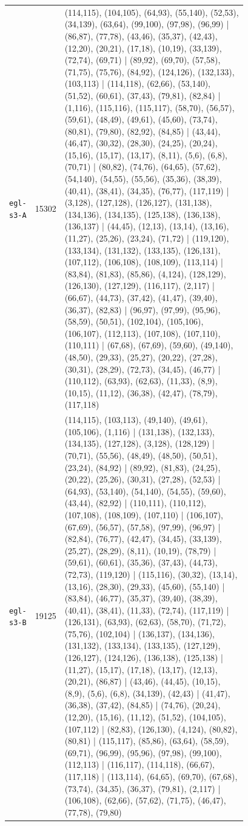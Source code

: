 \begin{landscape}
\begin{longtable}{lr>{\tiny\raggedright\arraybackslash}p{0.78\linewidth}}
\texttt{egl-s3-A} & 15302 & (114,115), (104,105), (64,93), (55,140), (52,53), (34,139), (63,64), (99,100), (97,98), (96,99) | (86,87), (77,78), (43,46), (35,37), (42,43), (12,20), (20,21), (17,18), (10,19), (33,139), (72,74), (69,71) | (89,92), (69,70), (57,58), (71,75), (75,76), (84,92), (124,126), (132,133), (103,113) | (114,118), (62,66), (53,140), (51,52), (60,61), (37,43), (79,81), (82,84) | (1,116), (115,116), (115,117), (58,70), (56,57), (59,61), (48,49), (49,61), (45,60), (73,74), (80,81), (79,80), (82,92), (84,85) | (43,44), (46,47), (30,32), (28,30), (24,25), (20,24), (15,16), (15,17), (13,17), (8,11), (5,6), (6,8), (70,71) | (80,82), (74,76), (64,65), (57,62), (54,140), (54,55), (55,56), (35,36), (38,39), (40,41), (38,41), (34,35), (76,77), (117,119) | (3,128), (127,128), (126,127), (131,138), (134,136), (134,135), (125,138), (136,138), (136,137) | (44,45), (12,13), (13,14), (13,16), (11,27), (25,26), (23,24), (71,72) | (119,120), (133,134), (131,132), (133,135), (126,131), (107,112), (106,108), (108,109), (113,114) | (83,84), (81,83), (85,86), (4,124), (128,129), (126,130), (127,129), (116,117), (2,117) | (66,67), (44,73), (37,42), (41,47), (39,40), (36,37), (82,83) | (96,97), (97,99), (95,96), (58,59), (50,51), (102,104), (105,106), (106,107), (112,113), (107,108), (107,110), (110,111) | (67,68), (67,69), (59,60), (49,140), (48,50), (29,33), (25,27), (20,22), (27,28), (30,31), (28,29), (72,73), (34,45), (46,77) | (110,112), (63,93), (62,63), (11,33), (8,9), (10,15), (11,12), (36,38), (42,47), (78,79), (117,118) \\[2pt]
\texttt{egl-s3-B} & 19125 & (114,115), (103,113), (49,140), (49,61), (105,106), (1,116) | (131,138), (132,133), (134,135), (127,128), (3,128), (128,129) | (70,71), (55,56), (48,49), (48,50), (50,51), (23,24), (84,92) | (89,92), (81,83), (24,25), (20,22), (25,26), (30,31), (27,28), (52,53) | (64,93), (53,140), (54,140), (54,55), (59,60), (43,44), (82,92) | (110,111), (110,112), (107,108), (108,109), (107,110) | (106,107), (67,69), (56,57), (57,58), (97,99), (96,97) | (82,84), (76,77), (42,47), (34,45), (33,139), (25,27), (28,29), (8,11), (10,19), (78,79) | (59,61), (60,61), (35,36), (37,43), (44,73), (72,73), (119,120) | (115,116), (30,32), (13,14), (13,16), (28,30), (29,33), (45,60), (55,140) | (83,84), (46,77), (35,37), (39,40), (38,39), (40,41), (38,41), (11,33), (72,74), (117,119) | (126,131), (63,93), (62,63), (58,70), (71,72), (75,76), (102,104) | (136,137), (134,136), (131,132), (133,134), (133,135), (127,129), (126,127), (124,126), (136,138), (125,138) | (11,27), (15,17), (17,18), (13,17), (12,13), (20,21), (86,87) | (43,46), (44,45), (10,15), (8,9), (5,6), (6,8), (34,139), (42,43) | (41,47), (36,38), (37,42), (84,85) | (74,76), (20,24), (12,20), (15,16), (11,12), (51,52), (104,105), (107,112) | (82,83), (126,130), (4,124), (80,82), (80,81) | (115,117), (85,86), (63,64), (58,59), (69,71), (96,99), (95,96), (97,98), (99,100), (112,113) | (116,117), (114,118), (66,67), (117,118) | (113,114), (64,65), (69,70), (67,68), (73,74), (34,35), (36,37), (79,81), (2,117) | (106,108), (62,66), (57,62), (71,75), (46,47), (77,78), (79,80) \\[2pt]

\end{longtable}
\end{landscape}
